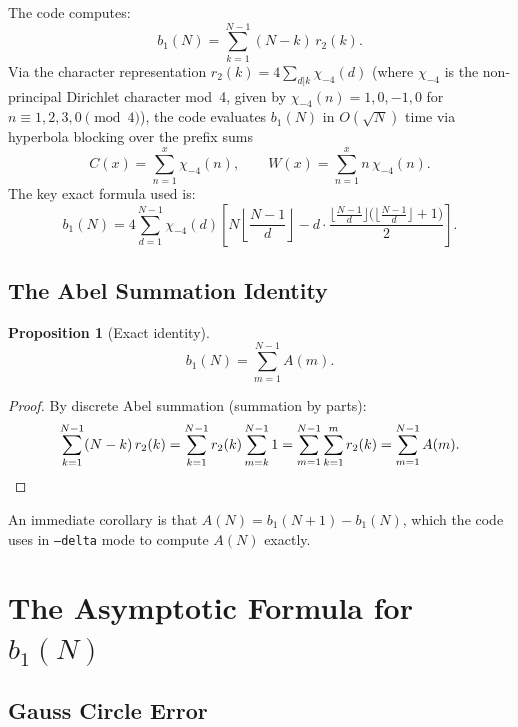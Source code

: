 \documentclass[12pt]{article}
\newtheorem{proposition}[theorem]{Proposition}
\theoremstyle{definition}
\begin{document}
The code computes:
\begin{equation}
    b_1(N) = \sum_{k=1}^{N-1}(N-k)\,r_2(k).
    \label{eq:b1def}
\end{equation}
Via the character representation $r_2(k) = 4\sum_{d|k}\chi_{-4}(d)$
(where $\chi_{-4}$ is the non-principal Dirichlet character mod~4,
given by $\chi_{-4}(n) = 1,0,-1,0$ for $n\equiv 1,2,3,0\pmod{4}$),
the code evaluates $b_1(N)$ in $O(\sqrt{N})$ time via hyperbola blocking
over the prefix sums
\[
    C(x) = \sum_{n=1}^{x}\chi_{-4}(n), \qquad
    W(x) = \sum_{n=1}^{x} n\,\chi_{-4}(n).
\]
The key exact formula used is:
\begin{equation}
    b_1(N) = 4\sum_{d=1}^{N-1}\chi_{-4}(d)
    \left[N\left\lfloor\frac{N-1}{d}\right\rfloor
    - d\cdot\frac{\lfloor\frac{N-1}{d}\rfloor
    \bigl(\lfloor\frac{N-1}{d}\rfloor+1\bigr)}{2}\right].
    \label{eq:b1formula}
\end{equation}

\subsection{The Abel Summation Identity}

\begin{proposition}[Exact identity]
\label{prop:abelid}
\[
    b_1(N) = \sum_{m=1}^{N-1} A(m).
\]
\end{proposition}

\begin{proof}
By discrete Abel summation (summation by parts):
\[
    \sum_{k=1}^{N-1}(N-k)\,r_2(k)
    = \sum_{k=1}^{N-1} r_2(k)\sum_{m=k}^{N-1}1
    = \sum_{m=1}^{N-1}\sum_{k=1}^{m} r_2(k)
    = \sum_{m=1}^{N-1} A(m). \qedhere
\]
\end{proof}

An immediate corollary is that $A(N) = b_1(N+1) - b_1(N)$, which the
code uses in \texttt{--delta} mode to compute $A(N)$ exactly.

\section{The Asymptotic Formula for \texorpdfstring{$b_1(N)$}{b1(N)}}

\subsection{Gauss Circle Error}
\end{document}
